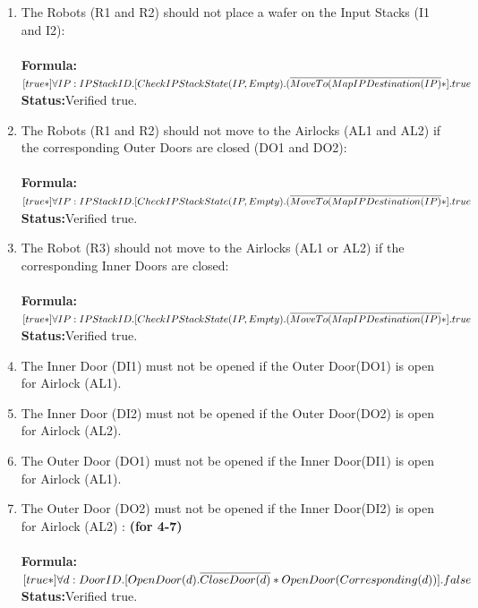 \documentclass[a4paper,12pt]{article}
\begin{document}
\begin{enumerate}
		
		\item The Robots (R1 and R2) should not place a wafer on the Input Stacks (I1 and I2):
		\\
		\\\textbf{Formula:} $[true*] \forall IP: IPStackID.[CheckIPStackState(IP, Empty).
		\\(\overline{MoveTo(MapIPDestination(IP)}*].true$ \\\textbf{Status:}Verified true.
		
		
		\item The Robots (R1 and R2) should not move to the Airlocks (AL1 and AL2) if the corresponding Outer Doors are closed (DO1 and DO2):
		\\
		\\\textbf{Formula:} $[true*] \forall IP: IPStackID.[CheckIPStackState(IP, Empty).
		\\(\overline{MoveTo(MapIPDestination(IP)}*].true$ \\\textbf{Status:}Verified true.
		
		
		\item The Robot (R3) should not move to the Airlocks (AL1 or AL2) if the corresponding Inner Doors are closed:
		\\
		\\\textbf{Formula:} $[true*] \forall IP: IPStackID.[CheckIPStackState(IP, Empty).
		\\(\overline{MoveTo(MapIPDestination(IP)}*].true$ \\\textbf{Status:}Verified true.
		
		
		\item The Inner Door (DI1) must not be opened if the Outer Door(DO1) is open for Airlock (AL1).
		
		
		\item The Inner Door (DI2) must not be opened if the Outer Door(DO2) is open for Airlock (AL2).
		
		
		\item The Outer Door (DO1) must not be opened if the Inner Door(DI1) is open for Airlock (AL1).
		
		
		\item The Outer Door (DO2) must not be opened if the Inner Door(DI2) is open for Airlock (AL2) : \textbf{(for 4-7)} 
		\\
		\\\textbf{Formula:} $[true*] \forall d: DoorID.[OpenDoor(d).\overline{CloseDoor(d)}*
		\\OpenDoor(Corresponding(d))].false$ 
		\\\textbf{Status:}Verified true.
		

\end{enumerate}
\end{document}
